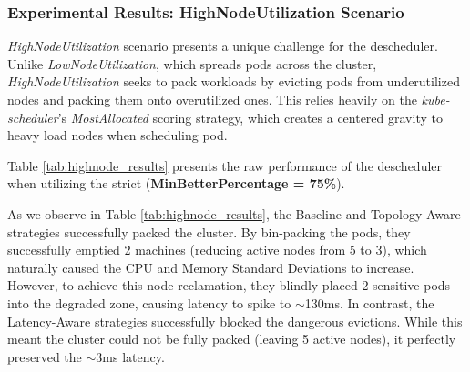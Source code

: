 \subsubsection{Experimental Results: HighNodeUtilization Scenario}
\label{subsec:netaware4_resultanalysis2}
\textit{HighNodeUtilization} scenario presents a unique challenge for the descheduler. Unlike \textit{LowNodeUtilization}, which spreads pods across the cluster, \textit{HighNodeUtilization} seeks to pack workloads by evicting pods from underutilized nodes and packing them onto overutilized ones. This relies heavily on the \textit{kube-scheduler}'s \textit{MostAllocated} scoring strategy, which creates a centered gravity to heavy load nodes when scheduling pod.

Table \ref{tab:highnode_results} presents the raw performance of the descheduler when utilizing the strict (\textbf{MinBetterPercentage = 75\%}).
\begin{table}[tbp]
    \centering
    \caption{Descheduler Performance: HighNodeUtilization Scenario}
    \label{tab:highnode_results}
\end{table}

As we observe in Table \ref{tab:highnode_results}, the Baseline and Topology-Aware strategies successfully packed the cluster. By bin-packing the pods, they successfully emptied 2 machines (reducing active nodes from 5 to 3), which naturally caused the CPU and Memory Standard Deviations to increase. However, to achieve this node reclamation, they blindly placed 2 sensitive pods into the degraded zone, causing latency to spike to $\sim$130ms. In contrast, the Latency-Aware strategies successfully blocked the dangerous evictions. While this meant the cluster could not be fully packed (leaving 5 active nodes), it perfectly preserved the $\sim$3ms latency.


